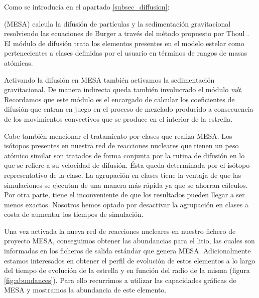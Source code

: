 Como se introducía en el apartado \ref{subsec_diffusion}:
\begin{center}
    \begin{minipage}{0.9\linewidth}
        \vspace{5pt}%
        {\small
        (MESA) calcula la difusión de partículas y la sedimentación gravitacional resolviendo las ecuaciones de Burger a través del método propuesto por Thoul \citep{Thoul1993}. El módulo de difusión trata los elementos presentes en el modelo estelar como pertenecientes a clases definidas por el usuario en términos de rangos de masas atómicas.
        }
        \vspace{5pt}%
    \end{minipage}
\end{center}

Activando la difusión en MESA también activamos la sedimentación gravitacional. De manera indirecta queda también involucrado el módulo \textit{mlt}. Recordamos que este módulo es el encargado de calcular los coeficientes de difusión que entran en juego en el proceso de mezclado producido a consecuencia de los movimientos convectivos que se produce en el interior de la estrella.\par

Cabe también mencionar el tratamiento por clases que realiza MESA. Los isótopos presentes en nuestra red de reacciones nucleares que tienen un peso atómico similar son tratados de forma conjunta por la rutina de difusión en lo que se refiere a su velocidad de difusión. Ésta queda determinada por el isótopo representativo de la clase. La agrupación en clases tiene la ventaja de que las simulaciones se ejecutan de una manera más rápida ya que se ahorran cálculos. Por otra parte, tiene el inconveniente de que los resultados pueden llegar a ser menos exactos. Nosotros hemos optado por desactivar la agrupación en clases a costa de aumentar los tiempos de simulación.\par

Una vez activada la nueva red de reacciones nucleares en nuestro fichero de proyecto MESA, conseguimos obtener las abundancias para el litio, las cuales son informadas en los ficheros de salida estándar que genera MESA. Adicionalmente estamos interesados en obtener el perfil de evolución de estos elementos a lo largo del tiempo de evolución de la estrella y en función del radio de la misma (figura \ref{fig:abundances}). Para ello recurrimos a utilizar las capacidades gráficas de MESA y mostramos la abundancia de este elemento.\par

